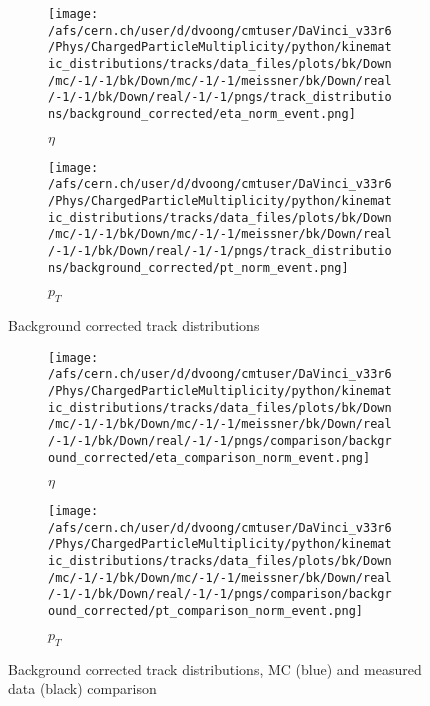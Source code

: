 \begin{figure}[h]
	\begin{subfigure}{0.49\textwidth}
		\texttt{[image: /afs/cern.ch/user/d/dvoong/cmtuser/DaVinci\_v33r6/Phys/ChargedParticleMultiplicity/python/kinematic\_distributions/tracks/data\_files/plots/bk/Down/mc/-1/-1/bk/Down/mc/-1/-1/meissner/bk/Down/real/-1/-1/bk/Down/real/-1/-1/pngs/track\_distributions/background\_corrected/eta\_norm\_event.png]}
		\caption{$\eta$}
		\label{fig: background corrected track distributions eta}
	\end{subfigure}
	\begin{subfigure}[h]{0.49\textwidth}
		\texttt{[image: /afs/cern.ch/user/d/dvoong/cmtuser/DaVinci\_v33r6/Phys/ChargedParticleMultiplicity/python/kinematic\_distributions/tracks/data\_files/plots/bk/Down/mc/-1/-1/bk/Down/mc/-1/-1/meissner/bk/Down/real/-1/-1/bk/Down/real/-1/-1/pngs/track\_distributions/background\_corrected/pt\_norm\_event.png]}
		\caption{$p_T$}
		\label{fig: background corrected track distributions pt}
	\end{subfigure}
	\caption{Background corrected track distributions}
	\label{fig: background corrected track distributions}
\end{figure}

\begin{figure}[h]
	\begin{subfigure}{0.49\textwidth}
		\texttt{[image: /afs/cern.ch/user/d/dvoong/cmtuser/DaVinci\_v33r6/Phys/ChargedParticleMultiplicity/python/kinematic\_distributions/tracks/data\_files/plots/bk/Down/mc/-1/-1/bk/Down/mc/-1/-1/meissner/bk/Down/real/-1/-1/bk/Down/real/-1/-1/pngs/comparison/background\_corrected/eta\_comparison\_norm\_event.png]}
		\caption{$\eta$}
		\label{fig: background corrected track distributions eta}
	\end{subfigure}
	\begin{subfigure}{0.49\textwidth}
		\texttt{[image: /afs/cern.ch/user/d/dvoong/cmtuser/DaVinci\_v33r6/Phys/ChargedParticleMultiplicity/python/kinematic\_distributions/tracks/data\_files/plots/bk/Down/mc/-1/-1/bk/Down/mc/-1/-1/meissner/bk/Down/real/-1/-1/bk/Down/real/-1/-1/pngs/comparison/background\_corrected/pt\_comparison\_norm\_event.png]}
		\caption{$p_T$}
		\label{fig: background corrected track distributions pt}
	\end{subfigure}
	\caption{Background corrected track distributions, MC (blue) and measured data (black) comparison}
	\label{fig: background corrected track distributions, MC and measured data comparison}
\end{figure}

